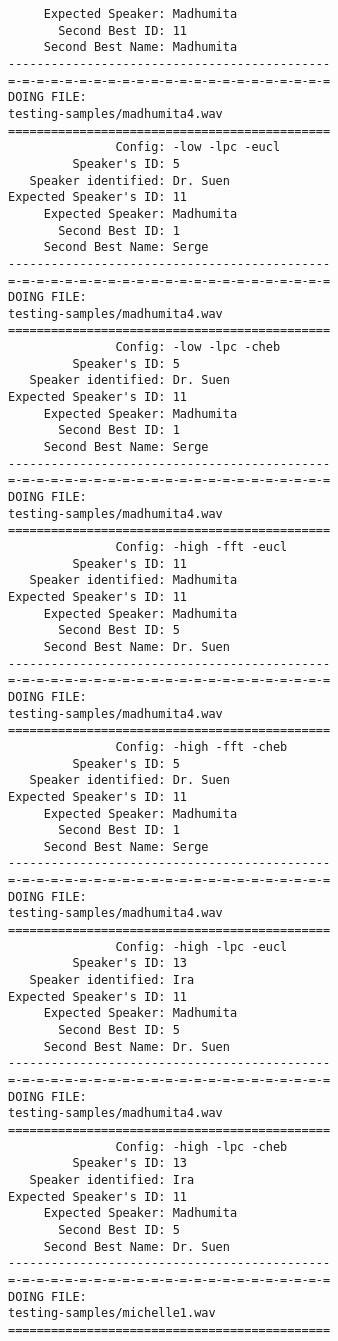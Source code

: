 \begin{verbatim}
     Expected Speaker: Madhumita
       Second Best ID: 11
     Second Best Name: Madhumita
---------------------------------------------
=-=-=-=-=-=-=-=-=-=-=-=-=-=-=-=-=-=-=-=-=-=-=
DOING FILE:
testing-samples/madhumita4.wav
=============================================
               Config: -low -lpc -eucl
         Speaker's ID: 5
   Speaker identified: Dr. Suen
Expected Speaker's ID: 11
     Expected Speaker: Madhumita
       Second Best ID: 1
     Second Best Name: Serge
---------------------------------------------
=-=-=-=-=-=-=-=-=-=-=-=-=-=-=-=-=-=-=-=-=-=-=
DOING FILE:
testing-samples/madhumita4.wav
=============================================
               Config: -low -lpc -cheb
         Speaker's ID: 5
   Speaker identified: Dr. Suen
Expected Speaker's ID: 11
     Expected Speaker: Madhumita
       Second Best ID: 1
     Second Best Name: Serge
---------------------------------------------
=-=-=-=-=-=-=-=-=-=-=-=-=-=-=-=-=-=-=-=-=-=-=
DOING FILE:
testing-samples/madhumita4.wav
=============================================
               Config: -high -fft -eucl
         Speaker's ID: 11
   Speaker identified: Madhumita
Expected Speaker's ID: 11
     Expected Speaker: Madhumita
       Second Best ID: 5
     Second Best Name: Dr. Suen
---------------------------------------------
=-=-=-=-=-=-=-=-=-=-=-=-=-=-=-=-=-=-=-=-=-=-=
DOING FILE:
testing-samples/madhumita4.wav
=============================================
               Config: -high -fft -cheb
         Speaker's ID: 5
   Speaker identified: Dr. Suen
Expected Speaker's ID: 11
     Expected Speaker: Madhumita
       Second Best ID: 1
     Second Best Name: Serge
---------------------------------------------
=-=-=-=-=-=-=-=-=-=-=-=-=-=-=-=-=-=-=-=-=-=-=
DOING FILE:
testing-samples/madhumita4.wav
=============================================
               Config: -high -lpc -eucl
         Speaker's ID: 13
   Speaker identified: Ira
Expected Speaker's ID: 11
     Expected Speaker: Madhumita
       Second Best ID: 5
     Second Best Name: Dr. Suen
---------------------------------------------
=-=-=-=-=-=-=-=-=-=-=-=-=-=-=-=-=-=-=-=-=-=-=
DOING FILE:
testing-samples/madhumita4.wav
=============================================
               Config: -high -lpc -cheb
         Speaker's ID: 13
   Speaker identified: Ira
Expected Speaker's ID: 11
     Expected Speaker: Madhumita
       Second Best ID: 5
     Second Best Name: Dr. Suen
---------------------------------------------
=-=-=-=-=-=-=-=-=-=-=-=-=-=-=-=-=-=-=-=-=-=-=
DOING FILE:
testing-samples/michelle1.wav
=============================================

\end{verbatim}
